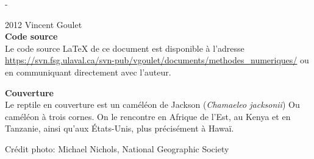 \begingroup
\calccentering{\unitlength}
\begin{adjustwidth*}{\unitlength}{-\unitlength}
  \setlength{\parindent}{0pt}
  \setlength{\parskip}{\baselineskip}

  {\textcopyright} 2012 Vincent Goulet \\

  

  \textbf{Code source} \\
  Le code source {\LaTeX} de ce document est disponible à l'adresse
    \url{https://svn.fsg.ulaval.ca/svn-pub/vgoulet/documents/methodes_numeriques/}
  ou en communiquant directement avec l'auteur.

  \textbf{Couverture} \\
  Le reptile en couverture est un caméléon de Jackson (\emph{Chamaeleo
    jacksonii}) Ou caméléon à trois cornes. On le rencontre en Afrique
  de l'Est, au Kenya et en Tanzanie, ainsi qu'aux États-Unis, plus
  précisément à Hawaï.

  Crédit photo: Michael Nichols, National Geographic Society
\end{adjustwidth*}
\endgroup

